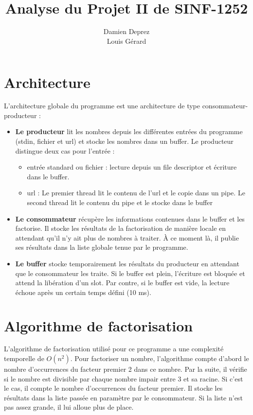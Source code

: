 \documentclass[12pt]{article}
\begin{document}
\title{Analyse du Projet II de SINF-1252}
\author{Damien Deprez \\ Louis Gérard}
\maketitle
\section{Architecture}
L'architecture globale du programme est une architecture de type consommateur-producteur : 
\begin{itemize}
\item \textbf{Le producteur} lit les nombres depuis les différentes entrées du programme (stdin, fichier et url) et stocke les nombres dans un buffer. Le producteur distingue deux cas pour l'entrée : 
\begin{itemize}
\item entrée standard ou fichier : lecture depuis un file descriptor et écriture dans le buffer.
\item url : Le premier thread lit le contenu de l'url et le copie dans un pipe. Le second thread lit le contenu du pipe et le stocke dans le buffer
\end{itemize}
\item \textbf{Le consommateur} récupère les informations contenues dans le buffer et les factorise. Il stocke les résultats de la factorisation de manière locale en attendant qu'il n'y ait plus de nombres à traiter. À ce moment là, il publie ses résultats dans la liste globale tenue par le programme.

\item \textbf{Le buffer} stocke temporairement les résultats du producteur en attendant que le consommateur les traite. Si le buffer est plein, l'écriture est bloquée et attend la libération d'un slot. Par contre, si le buffer est vide, la lecture échoue après un certain temps défini (10 ms).
\end{itemize}

\section{Algorithme de factorisation}
L'algorithme de factorisation utilisé pour ce programme a une complexité temporelle de $O(n^2)$. Pour factoriser un nombre, l'algorithme compte d'abord le nombre d'occurrences du facteur premier 2 dans ce nombre. Par la suite, il vérifie si le nombre est divisible par chaque nombre impair entre 3 et sa racine. Si c'est le cas, il compte le nombre d'occurrences du facteur premier. Il stocke les résultats dans la liste passée en paramètre par le consommateur. Si la liste n'est pas assez grande, il lui alloue plus de place.
\end{document}
